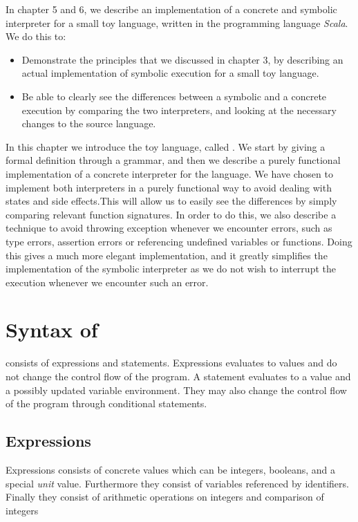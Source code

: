 
In chapter 5 and 6, we describe an implementation of a concrete and symbolic interpreter for a small toy language, written in the programming language \textsl{Scala}. We do this to: 
\begin{itemize}
	\item Demonstrate the principles that we discussed in chapter 3, by describing an actual implementation of symbolic execution for a small toy language.
	\item Be able to clearly see the differences between a symbolic and a concrete execution by comparing the two interpreters, and looking at the necessary changes to the source language. 
\end{itemize} 

In this chapter we introduce the toy language, called \explanguage. We start by giving a formal definition through a grammar, and then we describe a purely functional implementation of a concrete interpreter for the language. We have chosen to implement both interpreters in a purely functional way to avoid dealing with states and side effects.This will allow us to easily see the differences by simply comparing relevant function signatures. In order to do this, we also describe a technique to avoid throwing exception whenever we encounter errors, such as type errors, assertion errors or referencing undefined variables or functions. Doing this gives a much more elegant implementation, and it greatly simplifies the implementation of the symbolic interpreter as we do not wish to interrupt the execution whenever we encounter such an error.

\section{Syntax of \explanguage}

\explanguage consists of expressions and statements. Expressions evaluates to values and do not change the control flow of the program. A statement evaluates to a value and a possibly updated variable environment. They may also change the control flow of the program through conditional statements.
 

\subsection{Expressions}


Expressions consists of concrete values which can be integers, booleans, and a special \textsl{unit} value. Furthermore they consist of variables referenced by identifiers. Finally they consist of arithmetic operations on integers and comparison of integers 

